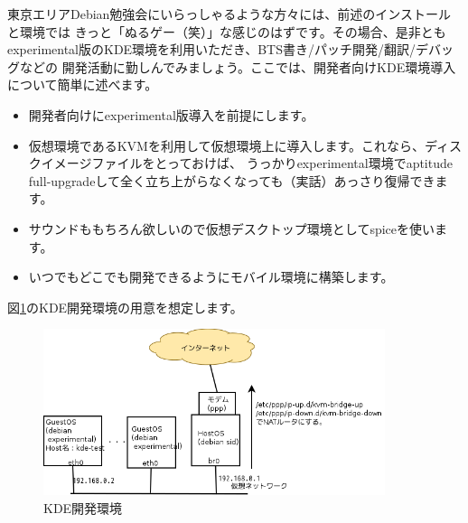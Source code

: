\documentclass[mingoth,a4paper]{jsarticle}
\begin{document}
東京エリアDebian勉強会にいらっしゃるような方々には、前述のインストールと環境では
きっと「ぬるゲー（笑）」な感じのはずです。その場合、是非とも
experimental版のKDE環境を利用いただき、BTS書き/パッチ開発/翻訳/デバッグなどの
開発活動に勤しんでみましょう。ここでは、開発者向けKDE環境導入について簡単に述べます。

\begin{itemize}
\item 開発者向けにexperimental版導入を前提にします。
\item 仮想環境であるKVMを利用して仮想環境上に導入します。これなら、ディスクイメージファイルをとっておけば、
うっかりexperimental環境でaptitude full-upgradeして全く立ち上がらなくなっても（実話）あっさり復帰できます。
\item サウンドももちろん欲しいので仮想デスクトップ環境としてspiceを使います。
\item いつでもどこでも開発できるようにモバイル環境に構築します。
\end{itemize}
図\ref{fig:kde-env}のKDE開発環境の用意を想定します。

\begin{figure}[ht]
\begin{center}
\includegraphics[width=10cm]{image201202/kdedesk/kde-dev-env.png}
\caption{\label{fig:kde-env}KDE開発環境}
\end{center}
\end{figure}
\end{document}

